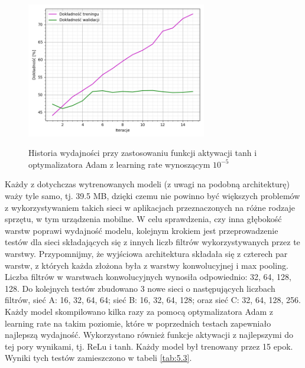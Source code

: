\begin{figure}[H]
    \caption{Historia wydajności przy zastosowaniu funkcji aktywacji tanh i optymalizatora Adam z learning rate wynoszącym $10^{-5}$}
    \centering
    \includegraphics[width=0.7\textwidth]{wykres2.png}
    \label{pic:5.2}
\end{figure}

Każdy z dotychczas wytrenowanych modeli (z uwagi na podobną architekturę) waży tyle samo, tj. 39.5 MB, dzięki czemu nie powinno być większych problemów z wykorzystywaniem takich sieci w aplikacjach przeznaczonych na różne rodzaje sprzętu, w tym urządzenia mobilne. W celu sprawdzenia, czy inna głębokość warstw poprawi wydajność modelu, kolejnym krokiem jest przeprowadzenie testów dla sieci składających się z innych liczb filtrów wykorzystywanych przez te warstwy. Przypomnijmy, że wyjściowa architektura składała się z czterech par warstw, z których każda złożona była z warstwy konwolucyjnej i max pooling. Liczba filtrów w warstwach konwolucyjnych wynosiła odpowiednio: 32, 64, 128, 128. Do kolejnych testów zbudowano 3 nowe sieci o następujących liczbach filtrów, sieć A: 16, 32, 64, 64; sieć B: 16, 32, 64, 128; oraz sieć C: 32, 64, 128, 256. Każdy model skompilowano kilka razy za pomocą optymalizatora Adam z learning rate na takim poziomie, które w poprzednich testach zapewniało najlepszą wydajność. Wykorzystano również funkcje aktywacji z najlepszymi do tej pory wynikami, tj. ReLu i tanh. Każdy model był trenowany przez 15 epok. Wyniki tych testów zamieszczono w tabeli \ref{tab:5.3}.


